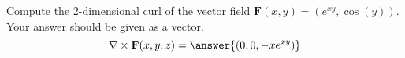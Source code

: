 \begin{problem}
Compute the 2-dimensional curl of the vector field $\mathbf{F}(x,y) = (e^{xy},\cos(y))$. Your answer should be given as a vector.
\[
\nabla\times\mathbf{F}(x,y,z) = \answer{(0,0,-xe^{xy})}
\]
\end{problem}